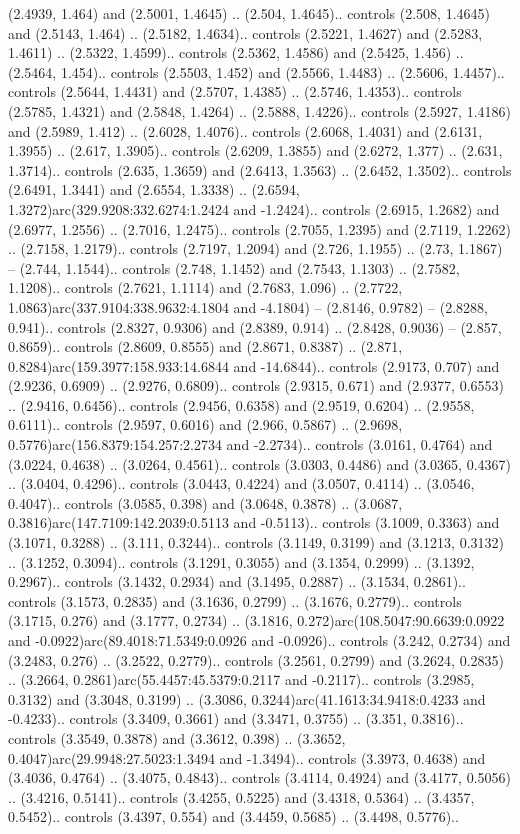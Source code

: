 (2.4939, 1.464) and (2.5001, 1.4645) .. (2.504, 1.4645).. controls (2.508, 1.4645) and (2.5143, 1.464) .. (2.5182, 1.4634).. controls (2.5221, 1.4627) and (2.5283, 1.4611) .. (2.5322, 1.4599).. controls (2.5362, 1.4586) and (2.5425, 1.456) .. (2.5464, 1.454).. controls (2.5503, 1.452) and (2.5566, 1.4483) .. (2.5606, 1.4457).. controls (2.5644, 1.4431) and (2.5707, 1.4385) .. (2.5746, 1.4353).. controls (2.5785, 1.4321) and (2.5848, 1.4264) .. (2.5888, 1.4226).. controls (2.5927, 1.4186) and (2.5989, 1.412) .. (2.6028, 1.4076).. controls (2.6068, 1.4031) and (2.6131, 1.3955) .. (2.617, 1.3905).. controls (2.6209, 1.3855) and (2.6272, 1.377) .. (2.631, 1.3714).. controls (2.635, 1.3659) and (2.6413, 1.3563) .. (2.6452, 1.3502).. controls (2.6491, 1.3441) and (2.6554, 1.3338) .. (2.6594, 1.3272)arc(329.9208:332.6274:1.2424 and -1.2424).. controls (2.6915, 1.2682) and (2.6977, 1.2556) .. (2.7016, 1.2475).. controls (2.7055, 1.2395) and (2.7119, 1.2262) .. (2.7158, 1.2179).. controls (2.7197, 1.2094) and (2.726, 1.1955) .. (2.73, 1.1867) -- (2.744, 1.1544).. controls (2.748, 1.1452) and (2.7543, 1.1303) .. (2.7582, 1.1208).. controls (2.7621, 1.1114) and (2.7683, 1.096) .. (2.7722, 1.0863)arc(337.9104:338.9632:4.1804 and -4.1804) -- (2.8146, 0.9782) -- (2.8288, 0.941).. controls (2.8327, 0.9306) and (2.8389, 0.914) .. (2.8428, 0.9036) -- (2.857, 0.8659).. controls (2.8609, 0.8555) and (2.8671, 0.8387) .. (2.871, 0.8284)arc(159.3977:158.933:14.6844 and -14.6844).. controls (2.9173, 0.707) and (2.9236, 0.6909) .. (2.9276, 0.6809).. controls (2.9315, 0.671) and (2.9377, 0.6553) .. (2.9416, 0.6456).. controls (2.9456, 0.6358) and (2.9519, 0.6204) .. (2.9558, 0.6111).. controls (2.9597, 0.6016) and (2.966, 0.5867) .. (2.9698, 0.5776)arc(156.8379:154.257:2.2734 and -2.2734).. controls (3.0161, 0.4764) and (3.0224, 0.4638) .. (3.0264, 0.4561).. controls (3.0303, 0.4486) and (3.0365, 0.4367) .. (3.0404, 0.4296).. controls (3.0443, 0.4224) and (3.0507, 0.4114) .. (3.0546, 0.4047).. controls (3.0585, 0.398) and (3.0648, 0.3878) .. (3.0687, 0.3816)arc(147.7109:142.2039:0.5113 and -0.5113).. controls (3.1009, 0.3363) and (3.1071, 0.3288) .. (3.111, 0.3244).. controls (3.1149, 0.3199) and (3.1213, 0.3132) .. (3.1252, 0.3094).. controls (3.1291, 0.3055) and (3.1354, 0.2999) .. (3.1392, 0.2967).. controls (3.1432, 0.2934) and (3.1495, 0.2887) .. (3.1534, 0.2861).. controls (3.1573, 0.2835) and (3.1636, 0.2799) .. (3.1676, 0.2779).. controls (3.1715, 0.276) and (3.1777, 0.2734) .. (3.1816, 0.272)arc(108.5047:90.6639:0.0922 and -0.0922)arc(89.4018:71.5349:0.0926 and -0.0926).. controls (3.242, 0.2734) and (3.2483, 0.276) .. (3.2522, 0.2779).. controls (3.2561, 0.2799) and (3.2624, 0.2835) .. (3.2664, 0.2861)arc(55.4457:45.5379:0.2117 and -0.2117).. controls (3.2985, 0.3132) and (3.3048, 0.3199) .. (3.3086, 0.3244)arc(41.1613:34.9418:0.4233 and -0.4233).. controls (3.3409, 0.3661) and (3.3471, 0.3755) .. (3.351, 0.3816).. controls (3.3549, 0.3878) and (3.3612, 0.398) .. (3.3652, 0.4047)arc(29.9948:27.5023:1.3494 and -1.3494).. controls (3.3973, 0.4638) and (3.4036, 0.4764) .. (3.4075, 0.4843).. controls (3.4114, 0.4924) and (3.4177, 0.5056) .. (3.4216, 0.5141).. controls (3.4255, 0.5225) and (3.4318, 0.5364) .. (3.4357, 0.5452).. controls (3.4397, 0.554) and (3.4459, 0.5685) .. (3.4498, 0.5776).. 